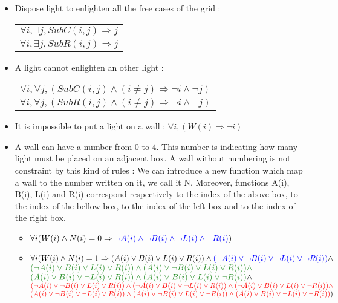 \documentclass[a4paper]{article}
\begin{document}
\begin{itemize}
\item Dispose light to enlighten all the free cases of the grid :
\begin{tabular}{c}
$ \forall i, \exists j, SubC(i, j) \Rightarrow j $ \\
$ \forall i, \exists j, SubR(i, j) \Rightarrow j $
\end{tabular}

\item A light cannot enlighten an other light :
\begin{tabular}{c}
$ \forall i, \forall j, ( SubC(i, j) \land ( i \neq j) \Rightarrow \neg i \land \neg j ) $ \\
$ \forall i, \forall j, ( SubR(i, j) \land ( i \neq j) \Rightarrow \neg i \land \neg j ) $ \\
\end{tabular}
\item It is impossible to put a light on a wall :
$ \forall i, ( W(i) \Rightarrow \neg i ) $

\item A wall can have a number from 0 to 4. This number is indicating how many light must be placed on an adjacent box. A wall without numbering is not constraint by this kind of rules : \newline
We can introduce a new function which map a wall to the number written on it, we call it N. Moreover, functions A(i), B(i), L(i) and R(i) correspond respectively to the index of the above box, to the index of the bellow box, to the index of the left box and to the index of the right box. \newline
\begin{itemize}
\item $ \forall i ( W(i) \land N(i)=0 \Rightarrow  \textcolor{blue}{\neg A(i) \land \neg B(i) \land \neg L(i) \land \neg R(i)} )$  \\


\item $ \forall i ( W(i) \land N(i)=1 \Rightarrow  ( A(i) \lor B(i) \lor L(i) \lor R(i) ) \land \textcolor{blue}{( \neg A(i) \lor \neg B(i) \lor \neg L(i) \lor \neg R(i))}  \land $ \\
$\textcolor{ForestGreen}{( \neg A(i) \lor B(i) \lor L(i) \lor R(i) ) \land  ( A(i) \lor \neg B(i) \lor L(i) \lor R(i) ) \land }$ \\
$ \textcolor{ForestGreen}{( A(i) \lor B(i) \lor \neg L(i) \lor R(i) ) \land ( A(i) \lor B(i) \lor L(i) \lor \neg R(i) )} \land $ \\
$\textcolor{red}{( \neg A(i) \lor \neg B(i) \lor L(i) \lor R(i)) \land ( \neg A(i) \lor B(i) \lor \neg L(i) \lor R(i) ) \land ( \neg A(i) \lor B(i) \lor L(i) \lor \neg R(i) )\land } $ \\ 
$ \textcolor{red}{ ( A(i) \lor \neg B(i) \lor \neg L(i) \lor R(i) ) \land ( A(i) \lor \neg B(i) \lor L(i) \lor \neg R(i) ) \land ( A(i) \lor B(i) \lor \neg L(i) \lor \neg R(i) ) }) $  \\



\end{itemize}
\end{itemize}
\end{document}
